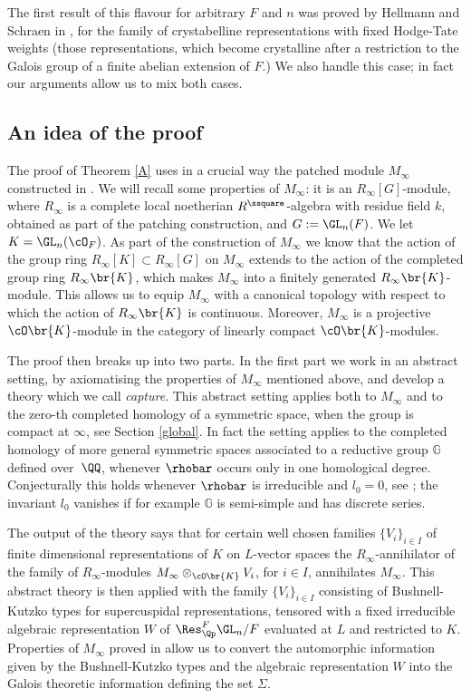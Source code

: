 \begin{remark}\label{rem_HS} The first result of this flavour for arbitrary $F$ and $n$ was proved by Hellmann
and Schraen in \cite{HS}, for the family of crystabelline representations with fixed Hodge-Tate
weights (\ie those representations, which become crystalline after a restriction to the Galois group of a finite abelian extension of $F$.) We also handle this case; in fact our arguments
allow us to mix both cases.
\end{remark}

\subsection{An idea of the proof} The proof of Theorem \ref{A} uses in a crucial way the
patched module $M_{\infty}$ constructed in \cite{six-authors}. We will recall some properties of $M_{\infty}$: it is an $R_{\infty}[G]$-module,
where $R_{\infty}$ is a complete local noetherian $R^\ssquare$-algebra with residue field $k$, obtained
as part of the patching construction, and $G:=\GL_n(F)$. We let $K=\GL_n(\cO_F)$. As part of the construction of $M_\infty$ we know that the action of the group ring $R_{\infty}[K]\subset
R_{\infty}[G]$ on $M_{\infty}$ extends to the action of the completed group ring $R_{\infty}\br{K}$,
which makes $M_{\infty}$ into a finitely generated $R_{\infty}\br{K}$-module.
This allows us to equip $M_{\infty}$ with a canonical topology with respect to which the action
of $R_{\infty}\br{K}$ is continuous. Moreover, $M_{\infty}$ is
a projective $\cO\br{K}$-module in the category of linearly compact $\cO\br{K}$-modules.

The proof then breaks up into two parts. In the first part we work in an abstract setting,
by axiomatising the properties of $M_\infty$ mentioned above, and develop a theory which we call \textit{capture}. This abstract setting applies both to $M_{\infty}$ and to the zero-th completed homology of a symmetric space, when the group is compact at $\infty$, see Section \ref{global}. In fact the setting applies to the completed homology
of more general symmetric spaces associated to a reductive group $\mathbb G$ defined over~$\QQ$, whenever $\rhobar$ occurs only in one homological degree. Conjecturally this holds whenever
$\rhobar$ is irreducible and $l_0=0$, see \cite[Conj.\,3.3]{matt_icm}; the invariant $l_0$ vanishes if for example $\mathbb G$ is semi-simple and has discrete series.

The output of the theory says that for certain well chosen families $\{ V_i\}_{i\in I}$ of finite dimensional representations of $K$ on $L$-vector spaces the $R_{\infty}$-annihilator
of the family of $R_{\infty}$-modules $M_{\infty}\otimes_{\cO\br{K}} V_i$, for $i\in I$,
annihilates $M_{\infty}$. This abstract theory is then applied with the family $\{V_i\}_{i\in I}$ consisting of
Bushnell-Kutzko types for supercuspidal representations, tensored with a fixed irreducible
algebraic representation $W$ of $\Res^F_{\Qp} \GL_n/F$ evaluated at $L$ and restricted to $K$. Properties of $M_{\infty}$ proved in \cite{six-authors} allow us to convert the automorphic
information given by the Bushnell-Kutzko types and the algebraic representation $W$ into the Galois
theoretic information defining the set $\Sigma$.

